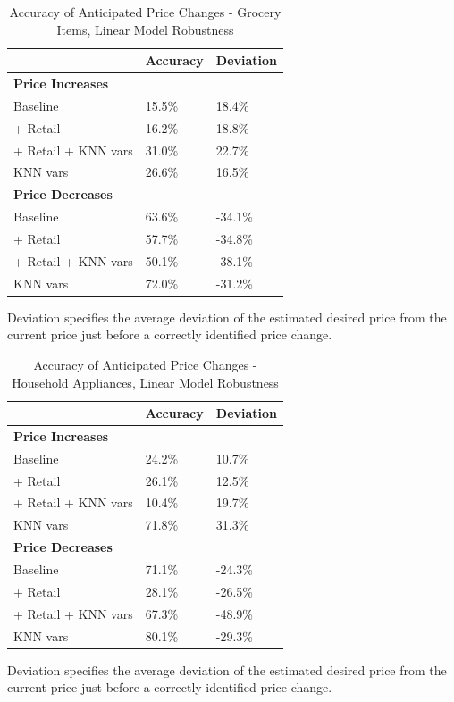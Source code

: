 \documentclass[11pt]{article}
\begin{document}
\begin{table}[ht]
    \centering
        \caption{Accuracy of Anticipated Price Changes - Grocery Items, Linear Model Robustness}
        \vspace{.5cm}
    \begin{tabular}{l | l  l } 
 \hline
  \textbf{} & \textbf{Accuracy} & \textbf{Deviation}  \\ [0.5ex] 
 \hline\hline
 \textbf{Price Increases} \\
 Baseline & 15.5\% & 18.4\% \\
   + Retail & 16.2\%  & 18.8\%  \\
   + Retail + KNN vars & 31.0\%  & 22.7\%  \\
 KNN vars & 26.6\%  & 16.5\%  \\
  \hline
  \textbf{Price Decreases} \\
  Baseline & 63.6\% &  -34.1\% \\
   + Retail & 57.7\%  & -34.8\%  \\
   + Retail + KNN vars & 50.1\%  & -38.1\%  \\
 KNN vars & 72.0\%  & -31.2\%  \\
  \hline
\end{tabular}
\begin{tablenotes}\footnotesize
\item Deviation specifies the average deviation of the estimated desired price from the current price just before a correctly identified price change.
\end{tablenotes}
\end{table}

\begin{table}[ht]
    \centering
        \caption{Accuracy of Anticipated Price Changes - Household Appliances, Linear Model Robustness}
        \vspace{.5cm}
    \begin{tabular}{l | l  l } 
 \hline
  \textbf{} & \textbf{Accuracy} & \textbf{Deviation}  \\ [0.5ex] 
 \hline\hline
 \textbf{Price Increases} \\
 Baseline & 24.2\% & 10.7\%  \\
    + Retail & 26.1\%  & 12.5\%  \\
   + Retail + KNN vars & 10.4\%  & 19.7\%  \\
 KNN vars & 71.8\%  & 31.3\%   \\
  \hline
  \textbf{Price Decreases} \\
   Baseline & 71.1\% &  -24.3\%  \\
   + Retail & 28.1\%  & -26.5\%  \\
   + Retail + KNN vars & 67.3\%  & -48.9\%  \\
 KNN vars & 80.1\%  & -29.3\%  \\
  \hline
\end{tabular}
\begin{tablenotes}\footnotesize
\item Deviation specifies the average deviation of the estimated desired price from the current price just before a correctly identified price change.
\end{tablenotes}
\end{table}
\end{document}
